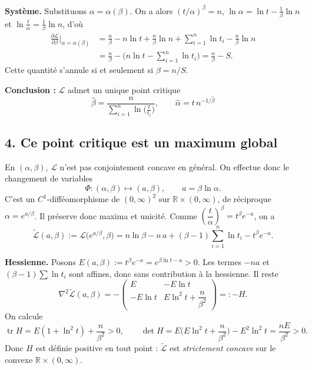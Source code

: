 \medskip
\noindent\textbf{Système.} Substituons $\alpha=\alpha(\beta)$. On a alors
$(t/\alpha)^\beta=n$, $\ln\alpha=\ln t-\frac{1}{\beta}\ln n$ et
$\ln\frac{t}{\alpha}=\frac{1}{\beta}\ln n$, d'où
\begin{align*}
  \frac{\partial \mathcal{L}}{\partial\beta}\Big|_{\alpha=\alpha(\beta)}
  &= \frac{n}{\beta}-n\ln t+\frac{n}{\beta}\ln n+\sum_{i=1}^n\ln t_i-\frac{n}{\beta}\ln n\\
  &= \frac{n}{\beta}-\Big(n\ln t-\sum_{i=1}^n\ln t_i\Big)
   = \frac{n}{\beta}-S .
\end{align*}
Cette quantité s'annule si et seulement si $\beta=n/S$.

\medskip
\noindent\textbf{Conclusion :} $\mathcal{L}$ admet un unique point critique
\[
  \boxed{\;\hat\beta=\frac{n}{\displaystyle\sum_{i=1}^n\ln\!\Big(\frac{t}{t_i}\Big)},
  \qquad
  \hat\alpha=t\,n^{-1/\hat\beta}\;}
\]

\subsection*{4. Ce point critique est un maximum global}

En $(\alpha,\beta)$, $\mathcal{L}$ n'est pas conjointement concave en général. On effectue donc le changement de variables
\[
  \Phi:(\alpha,\beta)\longmapsto(a,\beta),\qquad a=\beta\ln\alpha .
\]
C'est un $C^1$-difféomorphisme de $(0,\infty)^2$ sur $\mathbb{R}\times(0,\infty)$, de réciproque
$\alpha=e^{a/\beta}$. Il préserve donc maxima et unicité.
Comme $\left(\dfrac{t}{\alpha}\right)^{\beta}=t^{\beta}e^{-a}$, on a
\[
  \widetilde{\mathcal{L}}(a,\beta)
  := \mathcal{L}\big(e^{a/\beta},\beta\big)
  = n\ln\beta - n\,a + (\beta-1)\sum_{i=1}^n\ln t_i - t^{\beta}e^{-a}.
\]

\medskip
\noindent\textbf{Hessienne.} Posons $E(a,\beta):=t^{\beta}e^{-a}=e^{\beta\ln t-a}>0$.
Les termes $-na$ et $(\beta-1)\sum\ln t_i$ sont affines, donc sans contribution à la hessienne.
Il reste
\[
  \nabla^2\widetilde{\mathcal{L}}(a,\beta)
  = -\begin{pmatrix} E & -E\ln t\\ -E\ln t & E\ln^2 t+\dfrac{n}{\beta^2}\end{pmatrix}
  =: -H .
\]
On calcule
\[
  \operatorname{tr}H = E(1+\ln^2 t)+\frac{n}{\beta^2}>0,
  \qquad
  \det H = E\Big(E\ln^2 t+\frac{n}{\beta^2}\Big)-E^2\ln^2 t=\frac{nE}{\beta^2}>0 .
\]
Donc $H$ est définie positive en tout point : $\widetilde{\mathcal{L}}$ est
\emph{strictement concave} sur le convexe $\mathbb{R}\times(0,\infty)$.

